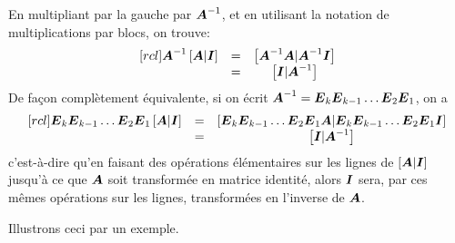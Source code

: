 \noindent En multipliant par la gauche par $\boldsymbol{A}^{-1}$, et en utilisant la notation de multiplications par blocs,
on trouve:
\[
\begin{matrix}[rcl]
\boldsymbol{A}^{-1} \left[ \boldsymbol{A} | \boldsymbol{I}\right] &=& \left[ \boldsymbol{A}^{-1}\boldsymbol{A} | \boldsymbol{A}^{-1}\boldsymbol{I}\right] \\
&=& \left[ \boldsymbol{I} | \boldsymbol{A}^{-1}\right]
\end{matrix}
\]
De façon complètement équivalente, si on écrit $\boldsymbol{A}^{-1} = \boldsymbol{E}_k \boldsymbol{E}_{k-1} \ldots \boldsymbol{E}_2 \boldsymbol{E}_1$, on a
\[
\begin{matrix}[rcl]
\boldsymbol{E}_k \boldsymbol{E}_{k-1} \ldots \boldsymbol{E}_2 \boldsymbol{E}_1 \left[ \boldsymbol{A} | \boldsymbol{I}\right] &=& \left[ \boldsymbol{E}_k \boldsymbol{E}_{k-1} \ldots \boldsymbol{E}_2 \boldsymbol{E}_1\boldsymbol{A} | \boldsymbol{E}_k \boldsymbol{E}_{k-1} \ldots \boldsymbol{E}_2 \boldsymbol{E}_1 \boldsymbol{I}\right] \\
&=& \left[ \boldsymbol{I} | \boldsymbol{A}^{-1}\right]
\end{matrix}
\]
c'est-à-dire qu'en faisant des opérations élémentaires sur les lignes de $[\boldsymbol{A}|\boldsymbol{I}]$ jusqu'à ce que $\boldsymbol{A}$ soit transformée
en matrice identité, alors $\boldsymbol{I}$ sera, par ces mêmes opérations sur les lignes, transformées en l'inverse de $\boldsymbol{A}$.

Illustrons ceci par un exemple.

